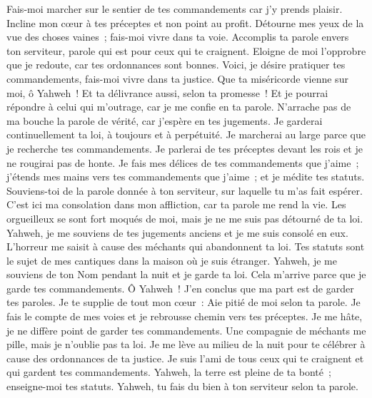 \begin{multicols}{2}
Fais-moi marcher sur le sentier de tes commandements car j'y prends plaisir.
Incline mon cœur à tes préceptes et non point au profit.
Détourne mes yeux de la vue des choses vaines~; fais-moi vivre dans ta voie.
Accomplis ta parole envers ton serviteur, parole qui est pour ceux qui te craignent.
Eloigne de moi l'opprobre que je redoute, car tes ordonnances sont bonnes.
Voici, je désire pratiquer tes commandements, fais-moi vivre dans ta justice.
 Que ta miséricorde vienne sur moi, ô Yahweh~! Et ta délivrance aussi, selon ta promesse~!
Et je pourrai répondre à celui qui m'outrage, car je me confie en ta parole.
N'arrache pas de ma bouche la parole de vérité, car j'espère en tes jugements.
Je garderai continuellement ta loi, à toujours et à perpétuité.
Je marcherai au large parce que je recherche tes commandements.
Je parlerai de tes préceptes devant les rois et je ne rougirai pas de honte.
Je fais mes délices de tes commandements que j'aime~;
j'étends mes mains vers tes commandements que j'aime~; et je médite tes statuts.
 Souviens-toi de la parole donnée à ton serviteur, sur laquelle tu m'as fait espérer.
C'est ici ma consolation dans mon affliction, car ta parole me rend la vie.
Les orgueilleux se sont fort moqués de moi, mais je ne me suis pas détourné de ta loi.
Yahweh, je me souviens de tes jugements anciens et je me suis consolé en eux.
L'horreur me saisit à cause des méchants qui abandonnent ta loi.
Tes statuts sont le sujet de mes cantiques dans la maison où je suis étranger.
Yahweh, je me souviens de ton Nom pendant la nuit et je garde ta loi.
Cela m'arrive parce que je garde tes commandements.
 Ô Yahweh~! J'en conclus que ma part est de garder tes paroles.
Je te supplie de tout mon cœur~: Aie pitié de moi selon ta parole.
Je fais le compte de mes voies et je rebrousse chemin vers tes préceptes.
Je me hâte, je ne diffère point de garder tes commandements.
Une compagnie de méchants me pille, mais je n'oublie pas ta loi.
Je me lève au milieu de la nuit pour te célébrer à cause des ordonnances de ta justice.
Je suis l'ami de tous ceux qui te craignent et qui gardent tes commandements.
Yahweh, la terre est pleine de ta bonté~; enseigne-moi tes statuts.
 Yahweh, tu fais du bien à ton serviteur selon ta parole.

\end{multicols}
